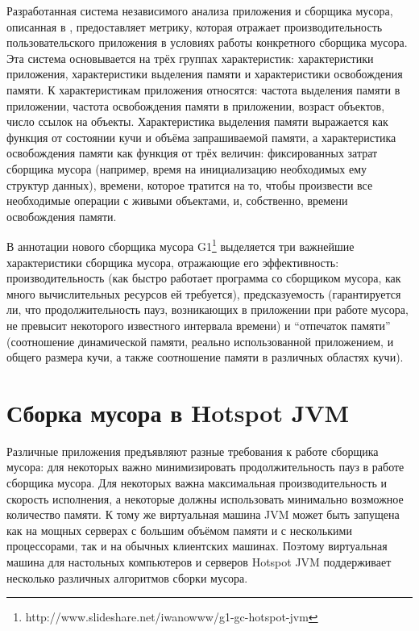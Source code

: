 \documentclass[12pt,a4paper]{article}
\begin{document}
Разработанная система независимого анализа приложения и сборщика мусора,
описанная в \cite{book:HBench}, предоставляет метрику, которая отражает производительность
пользовательского приложения в условиях работы конкретного сборщика мусора. Эта система
основывается на трёх группах характеристик: характеристики приложения, характеристики 
выделения памяти и характеристики освобождения памяти. К характеристикам приложения
относятся: частота выделения памяти в приложении, частота освобождения памяти в приложении,
возраст объектов, число ссылок на объекты. Характеристика выделения памяти выражается
как функция от состоянии кучи и объёма запрашиваемой памяти, а характеристика освобождения
памяти как функция от трёх величин: фиксированных затрат сборщика мусора (например,
время на инициализацию необходимых ему структур данных), времени, которое тратится
на то, чтобы произвести все необходимые операции с живыми объектами, и, собственно,
времени освобождения памяти.

В аннотации нового сборщика мусора G1\footnote{http://www.slideshare.net/iwanowww/g1-gc-hotspot-jvm}
выделяется три важнейшие характеристики сборщика мусора, отражающие его эффективность:
производительность (как быстро работает программа со сборщиком мусора, как много
вычислительных ресурсов ей требуется), предсказуемость (гарантируется ли, что продолжительность 
пауз, возникающих в приложении при работе мусора, не превысит некоторого известного
интервала времени) и ``отпечаток памяти'' (соотношение динамической памяти, реально
использованной приложением, и общего размера кучи, а также соотношение памяти в различных 
областях кучи).


\newpage
\section {Сборка мусора в Hotspot JVM}

Различные приложения предъявляют разные требования к работе сборщика мусора: для некоторых важно минимизировать
продолжительность пауз в работе сборщика мусора. Для некоторых важна максимальная 
производительность и скорость исполнения, а некоторые должны использовать минимально
возможное количество памяти. К тому же виртуальная машина JVM может быть запущена
как на мощных серверах с большим объёмом памяти и с несколькими процессорами, так и на 
обычных клиентских машинах. Поэтому виртуальная машина для настольных компьютеров и серверов
Hotspot JVM поддерживает несколько различных алгоритмов сборки
мусора.
\end{document}
